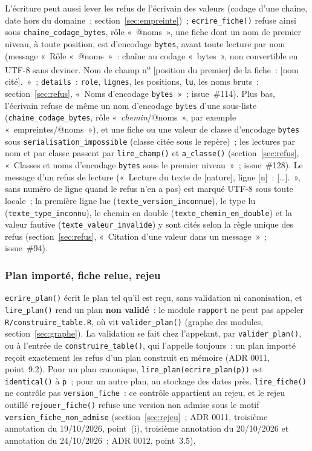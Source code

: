 \documentclass[a4paper,11pt]{article}
\newcommand{\code}[1]{\texttt{\small #1}}
\begin{document}
\noindent
L'écriture peut aussi lever les refus de l'écrivain des valeurs (codage d'une
chaîne, date hors du domaine~; section~\ref{sec:empreinte})~;
\code{ecrire\_fiche()} refuse ainsi sous \code{chaine\_codage\_bytes}, rôle
«~@noms~», une fiche dont un nom de premier niveau, à toute position, est
d'encodage \code{bytes}, avant toute lecture par nom (message «~Rôle
«~@noms~»~: chaîne au codage «~bytes~», non convertible en UTF-8 sans
deviner. Nom de champ n\textsuperscript{o} [position du premier] de la fiche~: [nom
cité].~»~; \code{details}~: \code{role}, \code{lignes}, les positions,
\code{lu}, les noms bruts~; section~\ref{sec:refus}, «~Noms d'encodage
\code{bytes}~»~; issue~\#114). Plus bas, l'écrivain refuse de même un nom
d'encodage \code{bytes} d'une sous-liste (\code{chaine\_codage\_bytes},
rôle «~\emph{chemin}/@noms~», par exemple «~empreintes/@noms~»), et une
fiche ou une valeur de classe d'encodage \code{bytes} sous
\code{serialisation\_impossible} (classe citée sous le repère)~; les lectures par nom et par classe passent par
\code{lire\_champ()} et \code{a\_classe()} (section~\ref{sec:refus},
«~Classes et noms d'encodage \code{bytes} sous le premier niveau~»~;
issue~\#128). Le message
d'un refus de lecture («~Lecture du texte de [nature], ligne [n]~:
[\ldots].~», sans numéro de ligne quand le refus n'en a pas) est marqué
UTF-8 sous toute locale~; la première ligne lue
(\code{texte\_version\_inconnue}), le type lu
(\code{texte\_type\_inconnu}), le chemin en double
(\code{texte\_chemin\_en\_double}) et la valeur fautive
(\code{texte\_valeur\_invalide}) y sont cités selon la règle unique des
refus (section~\ref{sec:refus}, «~Citation d'une valeur dans un
message~»~; issue~\#94).

\subsubsection*{Plan importé, fiche relue, rejeu}

\code{ecrire\_plan()} écrit le plan tel qu'il est reçu, sans validation ni
canonisation, et \code{lire\_plan()} rend un plan \textbf{non validé}~: le
module \code{rapport} ne peut pas appeler \code{R/construire\_table.R}, où vit
\code{valider\_plan()} (graphe des modules, section~\ref{sec:graphe}). La
validation se fait chez l'appelant, par \code{valider\_plan()}, ou à l'entrée
de \code{construire\_table()}, qui l'appelle toujours~: un plan importé
reçoit exactement les refus d'un plan construit en mémoire (ADR 0011,
point~9.2). Pour un plan canonique, \code{lire\_plan(ecrire\_plan(p))} est
\code{identical()} à \code{p}~; pour un autre plan, au stockage des dates
près. \code{lire\_fiche()} ne contrôle pas \code{version\_fiche}~: ce
contrôle appartient au rejeu, et le rejeu outillé \code{rejouer\_fiche()}
refuse une version non admise sous le motif \code{version\_fiche\_non\_admise}
(section~\ref{sec:rejeu}~; ADR 0011, troisième annotation du 19/10/2026,
point~(i), troisième annotation du 20/10/2026 et annotation du 24/10/2026~;
ADR 0012, point~3.5).
\end{document}
